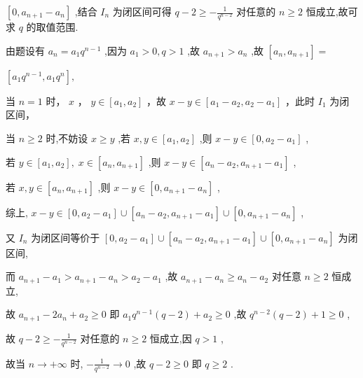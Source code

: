 \documentclass[10pt]{article}
\begin{document}
\(\left\lbrack  {0,{a}_{n + 1} - {a}_{n}}\right\rbrack\) ,结合 \({I}_{n}\) 为闭区间可得 \(q - 2 \geq   - \frac{1}{{q}^{n - 2}}\) 对任意的 \(n \geq  2\) 恒成立,故可求 \(q\) 的取值范围.

由题设有 \({a}_{n} = {a}_{1}{q}^{n - 1}\) ,因为 \({a}_{1} > 0,q > 1\) ,故 \({a}_{n + 1} > {a}_{n}\) ,故 \(\left\lbrack  {{a}_{n},{a}_{n + 1}}\right\rbrack   =\)

\(\left\lbrack  {{a}_{1}{q}^{n - 1},{a}_{1}{q}^{n}}\right\rbrack  ,\)

当 \(n = 1\) 时， \(x\) ， \(y \in  \left\lbrack  {{a}_{1},{a}_{2}}\right\rbrack\) ，故 \(x - y \in  \left\lbrack  {{a}_{1} - {a}_{2},{a}_{2} - {a}_{1}}\right\rbrack\) ，此时 \({I}_{1}\) 为闭区间，

当 \(n \geq  2\) 时,不妨设 \(x \geq  y\) ,若 \(x,y \in  \left\lbrack  {{a}_{1},{a}_{2}}\right\rbrack\) ,则 \(x - y \in  \left\lbrack  {0,{a}_{2} - {a}_{1}}\right\rbrack\) ,

若 \(y \in  \left\lbrack  {{a}_{1},{a}_{2}}\right\rbrack  ,\;x \in  \left\lbrack  {{a}_{n},{a}_{n + 1}}\right\rbrack\) ,则 \(x - y \in  \left\lbrack  {{a}_{n} - {a}_{2},{a}_{n + 1} - {a}_{1}}\right\rbrack\) ,

若 \(x,y \in  \left\lbrack  {{a}_{n},{a}_{n + 1}}\right\rbrack\) ,则 \(x - y \in  \left\lbrack  {0,{a}_{n + 1} - {a}_{n}}\right\rbrack\) ,

综上, \(x - y \in  \left\lbrack  {0,{a}_{2} - {a}_{1}}\right\rbrack   \cup  \left\lbrack  {{a}_{n} - {a}_{2},{a}_{n + 1} - {a}_{1}}\right\rbrack   \cup  \left\lbrack  {0,{a}_{n + 1} - {a}_{n}}\right\rbrack\) ,

又 \({I}_{n}\) 为闭区间等价于 \(\left\lbrack  {0,{a}_{2} - {a}_{1}}\right\rbrack   \cup  \left\lbrack  {{a}_{n} - {a}_{2},{a}_{n + 1} - {a}_{1}}\right\rbrack   \cup  \left\lbrack  {0,{a}_{n + 1} - {a}_{n}}\right\rbrack\) 为闭区间,

而 \({a}_{n + 1} - {a}_{1} > {a}_{n + 1} - {a}_{n} > {a}_{2} - {a}_{1}\) ,故 \({a}_{n + 1} - {a}_{n} \geq  {a}_{n} - {a}_{2}\) 对任意 \(n \geq  2\) 恒成立,

故 \({a}_{n + 1} - 2{a}_{n} + {a}_{2} \geq  0\) 即 \({a}_{1}{q}^{n - 1}\left( {q - 2}\right)  + {a}_{2} \geq  0\) ,故 \({q}^{n - 2}\left( {q - 2}\right)  + 1 \geq  0\) ,

故 \(q - 2 \geq   - \frac{1}{{q}^{n - 2}}\) 对任意的 \(n \geq  2\) 恒成立,因 \(q > 1\) ,

故当 \(n \rightarrow   + \infty\) 时, \(- \frac{1}{{q}^{n - 2}} \rightarrow  0\) ,故 \(q - 2 \geq  0\) 即 \(q \geq  2\) .
\end{document}
